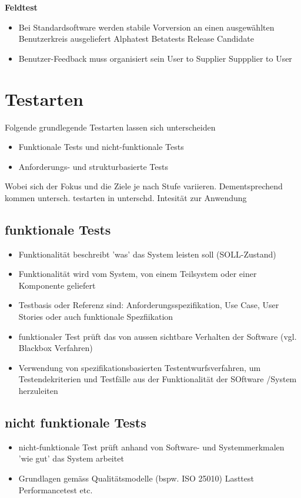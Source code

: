 \documentclass{report}
\theoremstyle{definition}
\theoremstyle{example}
\begin{document}
\textbf{Feldtest}
\begin{itemize}
   \item Bei Standardsoftware werden stabile Vorversion an einen ausgewählten Benutzerkreis ausgeliefert
   \subitem Alphatest
   \subitem Betatests
   \subitem Release Candidate
   \item Benutzer-Feedback muss organisiert sein
   \subitem User to Supplier
   \subitem Suppplier to User
\end{itemize}


\section{Testarten}
Folgende grundlegende Testarten lassen sich unterscheiden
\begin{itemize}
   \item Funktionale Tests und nicht-funktionale Tests
   \item Anforderungs- und strukturbasierte Tests
\end{itemize}
Wobei sich der Fokus und die Ziele je nach Stufe variieren. Dementsprechend kommen untersch. testarten in unterschd. Intesität zur Anwendung

\subsection{funktionale Tests}
\begin{itemize}
   \item Funktionalität beschreibt 'was' das System leisten soll (SOLL-Zustand)
   \item Funktionalität wird vom System, von einem Teilsystem oder einer Komponente geliefert
   \item Testbasis oder Referenz sind: Anforderungsspezifikation, Use Case, User Stories oder auch funktionale Spezfiikation
   \item funktionaler Test prüft das von aussen sichtbare Verhalten der Software (vgl. Blackbox Verfahren)
   \item Verwendung von spezifikationsbasierten Testentwurfsverfahren, um Testendekriterien und Testfälle aus der Funktionalität der SOftware /System herzuleiten
\end{itemize}

\subsection{nicht funktionale Tests}
\begin{itemize}
   \item nicht-funktionale Test prüft anhand von Software- und Systemmerkmalen 'wie gut' das System arbeitet
   \item Grundlagen gemäss Qualitätsmodelle (bspw. ISO 25010)
   \subitem Lasttest
   \subitem Performancetest
   \subitem etc.
\end{itemize}
\end{document}
